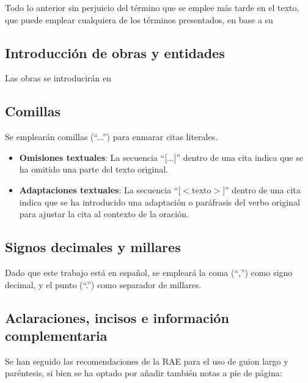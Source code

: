 Todo lo anterior sin perjuicio del término que se emplee más tarde en el texto, que puede emplear cualquiera
de los términos presentados, en base a su 


\subsection*{Introducción de obras y entidades}

Las obras se introducirán en 



\subsection*{Comillas}

Se emplearán comillas (``...'') para enmarar citas literales.

\begin{itemize}
    \item \textbf{Omisiones textuales}: 
        La secuencia ``[...]'' dentro de una cita indica que se ha omitido una parte del texto original.
    \item \textbf{Adaptaciones textuales}: 
        La secuencia ``[$<$texto$>$]'' dentro de una cita indica que se ha introducido una adaptación o 
        paráfrasis del verbo original para ajustar la cita al contexto de la oración.
\end{itemize}


\subsection*{Signos decimales y millares}

Dado que este trabajo está en español, se empleará la coma (``,'') como signo decimal, y el punto (``.'') como 
separador de millares.


\subsection*{Aclaraciones, incisos e información complementaria}

Se han seguido las recomendaciones de la RAE para el uso de guion largo y paréntesis, si bien se ha optado
por añadir también notas a pie de página: 

